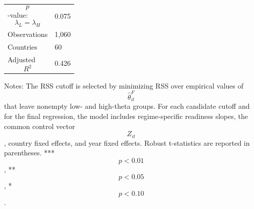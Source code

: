 \begin{table}[H]
\begin{threeparttable}
\begin{tabularx}{\textwidth}{lY}
$$p$$-value: $$\lambda_L=\lambda_H$$ & 0.075 \\
Observations & 1,060 \\
Countries & 60 \\
Adjusted $$R^2$$ & 0.426 \\
\bottomrule
\end{tabularx}
\begin{tablenotes}[flushleft]\footnotesize
\item Notes: The RSS cutoff is selected by minimizing RSS over empirical values of $$\widehat{\theta}^{F}_{it}$$ that leave nonempty low- and high-theta groups. For each candidate cutoff and for the final regression, the model includes regime-specific readiness slopes, the common control vector $$Z_{it}$$, country fixed effects, and year fixed effects. Robust t-statistics are reported in parentheses. *** $$p<0.01$$, ** $$p<0.05$$, * $$p<0.10$$.
\end{tablenotes}
\end{threeparttable}
\end{table}
